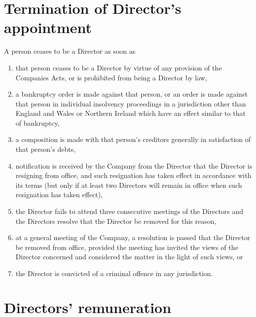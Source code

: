 \documentclass[a4paper,12pt]{article}
\renewcommand{\labelenumi}{\thesection.\arabic{enumi}}
\begin{document}
\section{Termination of Director's appointment}

A person ceases to be a Director as soon as

\begin{enumerate}
  \renewcommand{\labelenumi}{(\alph{enumi})}
  \item that person ceases to be a Director by virtue of any provision of the Companies Acts, or is prohibited from being a Director by law,
  \item a bankruptcy order is made against that person, or an order is made against that person in individual insolvency proceedings in a jurisdiction other than England and Wales or Northern Ireland which have an effect similar to that of bankruptcy,
  \item a composition is made with that person's creditors generally in satisfaction of that person's debts,
  \item notification is received by the Company from the Director that the Director is resigning from office, and such resignation has taken effect in accordance with its terms (but only if at least two Directors will remain in office when such resignation has taken effect),
  \item the Director fails to attend three consecutive meetings of the Directors and the Directors resolve that the Director be removed for this reason,
  \item at a general meeting of the Company, a resolution is passed that the Director be removed from office, provided the meeting has invited the views of the Director concerned and considered the matter in the light of such views, or
  \item the Director is convicted of a criminal offence in any jurisdiction.
\end{enumerate}

\section{Directors' remuneration}
\end{document}
